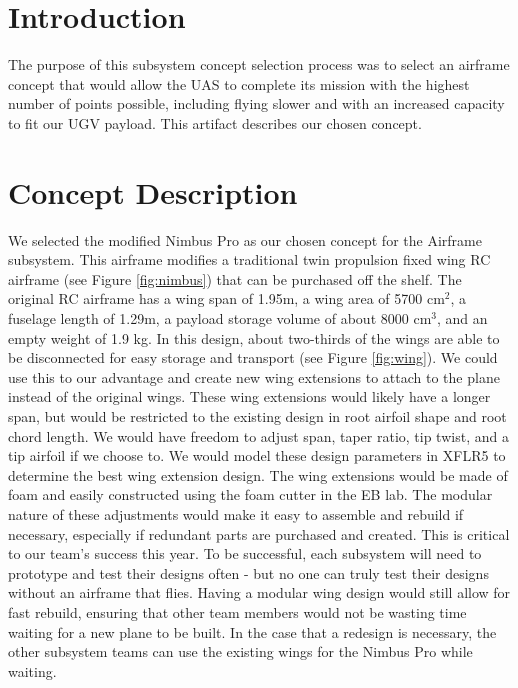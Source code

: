\documentclass[]{auvsi_doc}
\begin{document}
\begin{AUVSITitlePage}
\begin{artifacttable}
\end{artifacttable}
\end{AUVSITitlePage}

\section{Introduction}

The purpose of this subsystem concept selection process was to select an airframe concept that would allow the UAS to complete its mission with the highest number of points possible, including flying slower and with an increased capacity to fit our UGV payload. This artifact describes our chosen concept.

\section{Concept Description}

We selected the modified Nimbus Pro as our chosen concept for the Airframe subsystem. This airframe modifies a traditional twin propulsion fixed wing RC airframe (see Figure \ref{fig:nimbus}) that can be purchased off the shelf. The original RC airframe has a wing span of 1.95m, a wing area of 5700 cm$^2$, a fuselage length of 1.29m, a payload storage volume of about 8000 cm$^3$, and an empty weight of 1.9 kg. In this design, about two-thirds of the wings are able to be disconnected for easy storage and transport (see Figure \ref{fig:wing}). We could use this to our advantage and create new wing extensions to attach to the plane instead of the original wings. These wing extensions would likely have a longer span, but would be restricted to the existing design in root airfoil shape and root chord length. We would have freedom to adjust span, taper ratio, tip twist, and a tip airfoil if we choose to. We would model these design parameters in XFLR5 to determine the best wing extension design. The wing extensions would be made of foam and easily constructed using the foam cutter in the EB lab. The modular nature of these adjustments would make it easy to assemble and rebuild if necessary, especially if redundant parts are purchased and created. This is critical to our team's success this year. To be successful, each subsystem will need to prototype and test their designs often - but no one can truly test their designs without an airframe that flies. Having a modular wing design would still allow for fast rebuild, ensuring that other team members would not be wasting time waiting for a new plane to be built. In the case that a redesign is necessary, the other subsystem teams can use the existing wings for the Nimbus Pro while waiting.
\end{document}

